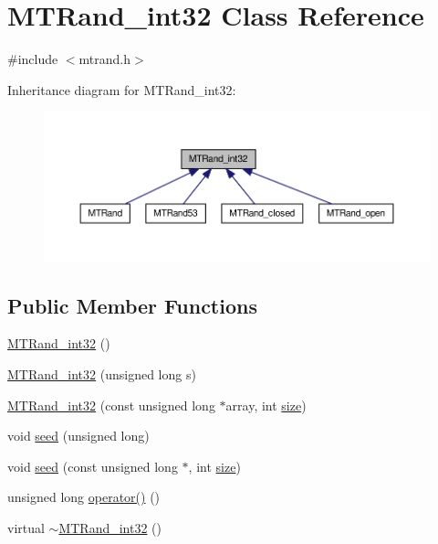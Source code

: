 \hypertarget{a00013}{\section{M\-T\-Rand\-\_\-int32 Class Reference}
\label{a00013}
}


{\ttfamily \#include $<$mtrand.\-h$>$}



Inheritance diagram for M\-T\-Rand\-\_\-int32\-:\nopagebreak
\begin{figure}[H]
\begin{center}
\leavevmode
\includegraphics[width=350pt]{a00154}
\end{center}
\end{figure}
\subsection*{Public Member Functions}
\begin{DoxyCompactItemize}
\item 
\hyperlink{a00013_a034f223c086f5368bd220b02f2cc12a8}{M\-T\-Rand\-\_\-int32} ()
\item 
\hyperlink{a00013_ad30f7c63a6f1fb3c3b76b8ce6ffa0206}{M\-T\-Rand\-\_\-int32} (unsigned long s)
\item 
\hyperlink{a00013_a19acddb3910a7282517b2ffc398b92b4}{M\-T\-Rand\-\_\-int32} (const unsigned long $\ast$array, int \hyperlink{a00056_ae113ea7f9e515a12ac4b5595c6faf61e}{size})
\item 
void \hyperlink{a00013_a0c57076fe30358e0700a7ce1baa0ea27}{seed} (unsigned long)
\item 
void \hyperlink{a00013_a3cabc1e3445716236a570ffd2f69686d}{seed} (const unsigned long $\ast$, int \hyperlink{a00056_ae113ea7f9e515a12ac4b5595c6faf61e}{size})
\item 
unsigned long \hyperlink{a00013_ad7fe22190d0411c6dac8e6f471633aa4}{operator()} ()
\item 
virtual \hyperlink{a00013_a364900abea0758d070ce89922159923a}{$\sim$\-M\-T\-Rand\-\_\-int32} ()
\end{DoxyCompactItemize}
